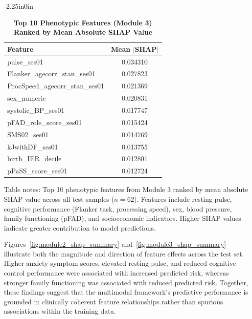 \documentclass[10pt,letterpaper]{article}
\begin{document}
\begin{table}[!t]
\begin{adjustwidth}{-2.25in}{0in}
\centering
\caption{\textbf{Top 10 Phenotypic Features (Module 3) Ranked by Mean Absolute SHAP Value}}
\label{tab:module3_shap}
\footnotesize
\renewcommand{\arraystretch}{1.3}

\begin{tabular}{|l|c|}
\hline
\textbf{Feature} & \textbf{Mean $|$SHAP$|$} \\
\hline
pulse\_ses01                    & 0.034310 \\
\hline
Flanker\_agecorr\_stan\_ses01   & 0.027823 \\
\hline
ProcSpeed\_agecorr\_stan\_ses01 & 0.021369 \\
\hline
sex\_numeric                    & 0.020831 \\
\hline
systolic\_BP\_ses01             & 0.017747 \\
\hline
pFAD\_role\_score\_ses01        & 0.015424 \\
\hline
SMS02\_ses01                    & 0.014769 \\
\hline
kJwithDF\_ses01                 & 0.013755 \\
\hline
birth\_IER\_decile              & 0.012801 \\
\hline
pPaSS\_score\_ses01             & 0.012724 \\
\hline
\end{tabular}

\begin{flushleft}
Table notes: Top 10 phenotypic features from Module 3 ranked by mean absolute SHAP value across all test samples ($n=62$). Features include resting pulse, cognitive performance (Flanker task, processing speed), sex, blood pressure, family functioning (pFAD), and socioeconomic indicators. Higher SHAP values indicate greater contribution to model predictions.
\end{flushleft}
\end{adjustwidth}
\end{table}

Figures~\ref{fig:module2_shap_summary} and~\ref{fig:module3_shap_summary} illustrate both the magnitude and direction of feature effects across the test set. Higher anxiety symptom scores, elevated resting pulse, and reduced cognitive control performance were associated with increased predicted risk, whereas stronger family functioning was associated with reduced predicted risk. Together, these findings suggest that the multimodal framework's predictive performance is grounded in clinically coherent feature relationships rather than spurious associations within the training data.
\end{document}
